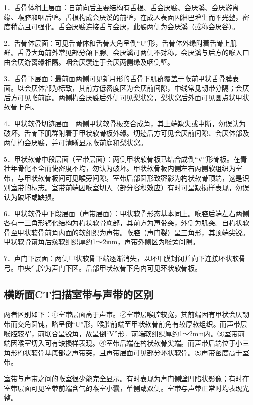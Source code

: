 1．舌骨体稍上层面：自前向后主要结构有舌根、舌会厌襞、会厌溪、会厌游离缘、喉腔和咽后壁。舌根构成会厌溪的前壁，在成人表面因淋巴增生而不光整，密度稍高且可强化。舌会厌襞连接舌与会厌，此襞两侧为会厌溪（或称会厌谷）。

2．舌骨体层面：可见舌骨体和舌骨大角呈倒“U”形，舌骨体外缘附着舌骨上肌群。舌骨大角前外常见部分颌下腺。会厌溪可两侧不对称，会厌溪与后方的喉入口由会厌游离缘相隔。咽会厌襞连于会厌两侧缘及咽侧壁。

3．舌骨下层面：最前面两侧可见新月形的舌骨下肌群覆盖于喉前甲状舌骨膜表面。以会厌体部为标致，其前方低密度区为会厌前间隙，中线常见韧带分隔；会厌后方可见喉前庭。两侧杓会厌襞后外侧可见梨状窝，梨状窝后外面可见圆点状甲状软骨上角。

4．甲状软骨切迹层面：两侧甲状软骨板交合成角，其上端缺失或中断，勿误认为破坏。舌骨下肌群附着于甲状软骨板外缘。切迹后方可见会厌前间隙、会厌体部及两侧杓会厌襞，并可清晰显示喉前庭和梨状窝。

5．甲状软骨中段层面（室带层面）：两侧甲状软骨板已结合成倒“V”形骨板。在青壮年骨化不全而使密度不均，勿认为破坏。甲状软骨板内侧左右两侧软组织为室带，与甲状软骨板间可见喉旁间隙。室带后部圆形致密影为杓状软骨顶端，这是识别室带的标志。室带前端因喉室切入（部分容积效应）有时可呈缺损样表现，勿误认为破坏或缺损。

6．甲状软骨中下段层面（声带层面）：甲状软骨形态基本同上。喉腔后端左右两侧各有一三角形钙化结构为杓状软骨底部，其前方为声带突，外侧为肌突。自杓状软骨至甲状软骨前角内面的软组织为声带。喉腔（声门裂）呈三角形，其顶端尖锐。甲状软骨前角后缘软组织厚约1～2mm，声带外侧区为喉旁间隙。

7．声门下层面：两侧甲状软骨下端逐渐消失，以环甲膜封闭并向下连接环状软骨弓。中央气腔为声门下区。后部甲状软骨下角内可见环状软骨板。

\subsection{横断面CT扫描室带与声带的区别}

两者区别如下：①室带层面高于声带。②室带层喉腔较宽，其前端因有甲状会厌韧带而交角圆钝，略呈倒“U”形，喉腔前端至甲状软骨前角有较厚软组织。而声带层喉腔较窄，前联合呈锐角，故呈倒“V”形，前端软组织厚约1～2mm内。③室带前端因喉室切入可有缺损样表现。④室带后端在杓状软骨尖端。而声带后端位于小三角形杓状软骨基底部之声带突，且声带层面可见部分环状软骨。⑤声带密度高于室带。

室带与声带之间的喉室很少能完全显示。有时表现为声门侧壁凹陷状影像；有时在室带层面可见室带前端含气的喉室小囊，单侧或双侧。室带与声带正常时均表现光整。

